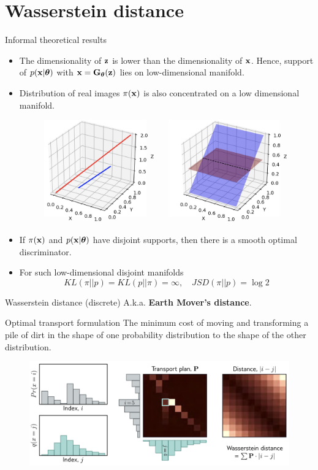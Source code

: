 \section{Wasserstein distance}
\begin{frame}{Informal theoretical results}
	\vspace{-0.3cm}
	\begin{itemize}
		\item The dimensionality of $\mathbf{z}$ is lower than the dimensionality of $\mathbf{x}$. Hence, support of $p(\mathbf{x} | \boldsymbol{\theta})$ with $\mathbf{x} = \mathbf{G}_{\boldsymbol{\theta}}(\mathbf{z})$ lies on low-dimensional manifold.
		\item Distribution of real images $\pi(\mathbf{x})$ is also concentrated on a low dimensional manifold.
		\begin{figure}
			\centering
			\includegraphics[width=0.55\linewidth]{figs/low_dim_manifold}
		\end{figure}
		\item If $\pi(\mathbf{x})$ and $p(\mathbf{x} | \boldsymbol{\theta})$ have disjoint supports, then there is a smooth optimal discriminator.
		\item For such low-dimensional disjoint manifolds
		\vspace{-0.2cm}
		\[
		KL(\pi || p) = KL(p || \pi) = \infty, \quad JSD(\pi || p) = \log 2
		\]
	\end{itemize}
\end{frame}
\begin{frame}{Wasserstein distance (discrete)}
	A.k.a. \textbf{Earth Mover's distance}.
	\begin{block}{Optimal transport formulation}
		The minimum cost of moving and transforming a pile of dirt in the shape of one probability distribution to the shape of the other distribution.
	\end{block}
	\begin{figure}
		\centering
		\includegraphics[width=\linewidth]{figs/discrete_wasserstein}
	\end{figure}
\end{frame}

